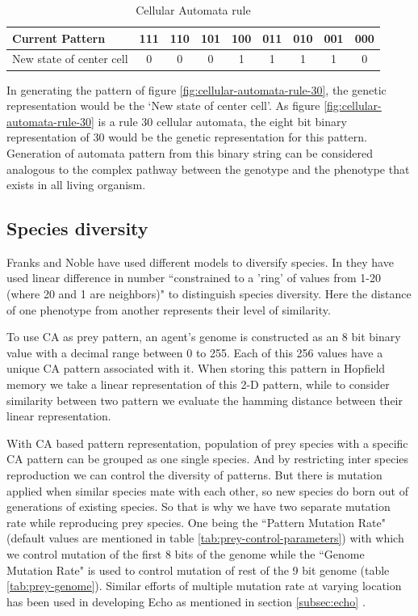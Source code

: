 \begin{table}[H]
	\centering
	\begin{tabular}{| l | c | c | c | c | c | c | c | c |}
	  \hline
	  Current Pattern & 111 & 110 & 101 & 100 & 011 & 010 & 001 & 000 \\ \hline
	  New state of center cell & 0 & 0 & 0 & 1 & 1 & 1 & 1 & 0 \\
	  \hline
	\end{tabular}
	\caption{Cellular Automata rule}
	\label{tab:cellular-automata-rule}
\end{table}

In generating the pattern of figure \ref{fig:cellular-automata-rule-30}, the genetic representation would be the `New state of center cell'. As figure \ref{fig:cellular-automata-rule-30} is a rule 30 cellular automata, the eight bit binary representation of 30 would be the genetic representation for this pattern. Generation of automata pattern from this binary string can be considered analogous to the complex pathway between the genotype and the phenotype that exists in all living organism.

\subsection{Species diversity}
Franks and Noble have used different models to diversify species. In \cite{franks2002} they have used linear difference in number ``constrained to a 'ring' of values  from 1-20 (where 20 and 1 are neighbors)" to distinguish species diversity. Here the distance of one phenotype from another represents their level of similarity. 

To use CA as prey pattern, an agent's genome is constructed as an 8 bit binary value with a decimal range between 0 to 255. Each of this 256 values have a unique CA pattern associated with it. When storing this pattern in Hopfield memory we take a linear representation of this 2-D pattern, while to consider similarity between two pattern we evaluate the hamming distance between their linear representation. 

With CA based pattern representation, population of prey species with a specific CA pattern can be grouped as one single species. And by restricting inter species reproduction we can control the diversity of patterns. But there is mutation applied when similar species mate with each other, so new species do born out of generations of existing species. So that is why we have two separate mutation rate while reproducing prey species. One being the ``Pattern Mutation Rate" (default values are mentioned in table \ref{tab:prey-control-parameters}) with which we control mutation of the first 8 bits of the genome while the ``Genome Mutation Rate" is used to control mutation of rest of the 9 bit genome (table \ref{tab:prey-genome}). Similar efforts of multiple mutation rate at varying location has been used in developing Echo as mentioned in section \ref{subsec:echo} \cite{hraber1997}.

